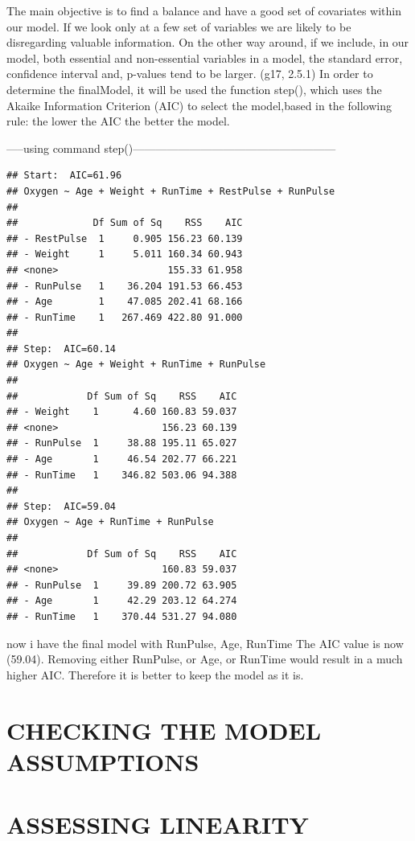 \documentclass[]{article}
\begin{document}
The main objective is to find a balance and have a good set of
covariates within our model. If we look only at a few set of variables
we are likely to be disregarding valuable information. On the other way
around, if we include, in our model, both essential and non-essential
variables in a model, the standard error, confidence interval and,
p-values tend to be larger. (g17, 2.5.1) In order to determine the
finalModel, it will be used the function step(), which uses the Akaike
Information Criterion (AIC) to select the model,based in the following
rule: the lower the AIC the better the model.

-----using command
step()------------------------------------------------------

\begin{verbatim}
## Start:  AIC=61.96
## Oxygen ~ Age + Weight + RunTime + RestPulse + RunPulse
## 
##             Df Sum of Sq    RSS    AIC
## - RestPulse  1     0.905 156.23 60.139
## - Weight     1     5.011 160.34 60.943
## <none>                   155.33 61.958
## - RunPulse   1    36.204 191.53 66.453
## - Age        1    47.085 202.41 68.166
## - RunTime    1   267.469 422.80 91.000
## 
## Step:  AIC=60.14
## Oxygen ~ Age + Weight + RunTime + RunPulse
## 
##            Df Sum of Sq    RSS    AIC
## - Weight    1      4.60 160.83 59.037
## <none>                  156.23 60.139
## - RunPulse  1     38.88 195.11 65.027
## - Age       1     46.54 202.77 66.221
## - RunTime   1    346.82 503.06 94.388
## 
## Step:  AIC=59.04
## Oxygen ~ Age + RunTime + RunPulse
## 
##            Df Sum of Sq    RSS    AIC
## <none>                  160.83 59.037
## - RunPulse  1     39.89 200.72 63.905
## - Age       1     42.29 203.12 64.274
## - RunTime   1    370.44 531.27 94.080
\end{verbatim}

now i have the final model with RunPulse, Age, RunTime The AIC value is
now (59.04). Removing either RunPulse, or Age, or RunTime would result
in a much higher AIC. Therefore it is better to keep the model as it is.

\section{CHECKING THE MODEL
ASSUMPTIONS}\label{checking-the-model-assumptions}

\section{ASSESSING LINEARITY}\label{assessing-linearity}
\end{document}
